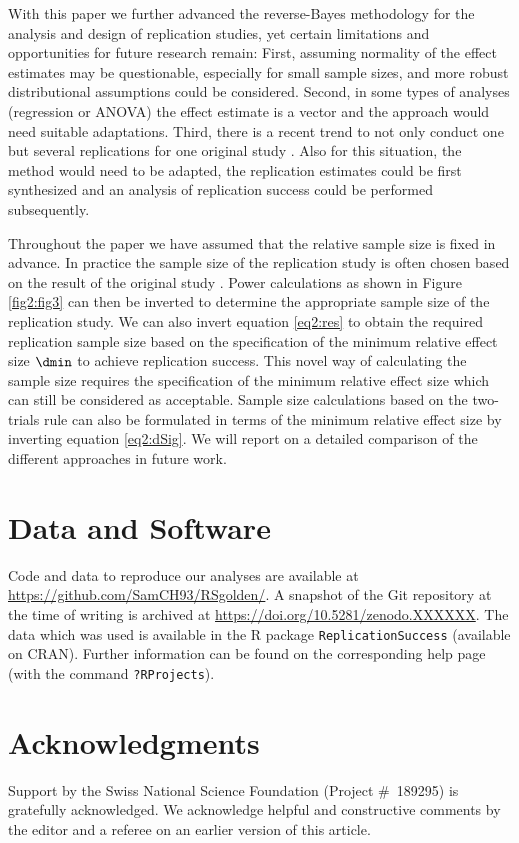 With this paper we further advanced the reverse-Bayes methodology for the
analysis and design of replication studies, yet certain limitations and
opportunities for future research remain: First, assuming normality of the
effect estimates may be questionable, especially for small sample sizes, and
more robust distributional assumptions could be considered. Second, in some
types of analyses (\eg regression or ANOVA) the effect estimate is a vector and
the approach would need suitable adaptations. Third, there is a recent trend to
not only conduct one but several replications for one original study
\citep[\eg][]{Klein2014, Ebersole2016, Klein2018}. Also for this situation, the
method would need to be adapted, \eg the replication estimates could be first
synthesized and an analysis of replication success could be performed
subsequently.


Throughout the paper we have assumed that the relative sample size is fixed in
advance. In practice the sample size of the replication study is often chosen
based on the result of the original study \citep{Anderson2017}. Power
calculations as shown in Figure \ref{fig2:fig3} can then be inverted to determine
the appropriate sample size of the replication study. We can also invert
equation \eqref{eq2:res} to obtain the required replication sample size based on
the specification of the minimum relative effect size $\dmin$ to achieve
replication success. This novel way of calculating the sample size requires the
specification of the minimum relative effect size which can still be considered
as acceptable. Sample size calculations based on the two-trials rule can also be
formulated in terms of the minimum relative effect size by inverting equation
\eqref{eq2:dSig}. We will report on a detailed comparison of the different
approaches in future work.



\section*{Data and Software}
Code and data to reproduce our analyses are available at
\url{https://github.com/SamCH93/RSgolden/}. A snapshot of the Git repository at
the time of writing is archived at \url{https://doi.org/10.5281/zenodo.XXXXXX}.
The data which was used is available in the R package
\texttt{ReplicationSuccess} (available on CRAN). Further information can be
found on the corresponding help page (with the command \texttt{?RProjects}).

\section*{Acknowledgments}
Support by the Swiss National Science Foundation (Project \#~189295) is
gratefully acknowledged. We acknowledge helpful and constructive comments by the
editor and a referee on an earlier version of this article.




